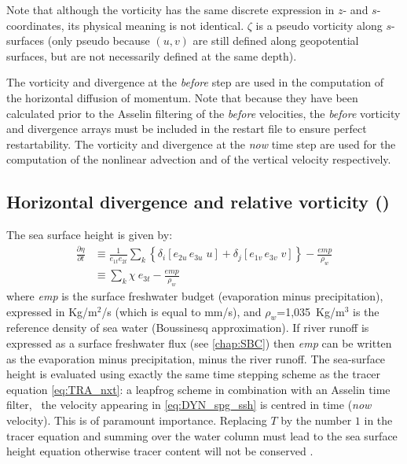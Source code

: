 \documentclass[../main/NEMO_manual]{subfiles}
\begin{document}
Note that although the vorticity has the same discrete expression in $z$- and $s$-coordinates,
its physical meaning is not identical.
$\zeta$ is a pseudo vorticity along $s$-surfaces
(only pseudo because $(u,v)$ are still defined along geopotential surfaces,
but are not necessarily defined at the same depth).

The vorticity and divergence at the \textit{before} step are used in the computation of
the horizontal diffusion of momentum.
Note that because they have been calculated prior to the Asselin filtering of the \textit{before} velocities,
the \textit{before} vorticity and divergence arrays must be included in the restart file to
ensure perfect restartability.
The vorticity and divergence at the \textit{now} time step are used for the computation of
the nonlinear advection and of the vertical velocity respectively.

\subsection[Horizontal divergence and relative vorticity (\textit{sshwzv.F90})]{Horizontal divergence and relative vorticity (\protect{})}
\label{subsec:DYN_sshwzv}

The sea surface height is given by:
\begin{equation}
  \label{eq:DYN_spg_ssh}
  \begin{aligned}
    \frac{\partial \eta }{\partial t}
    &\equiv    \frac{1}{e_{1t} e_{2t} }\sum\limits_k { \left\{  \delta_i \left[ {e_{2u}\,e_{3u}\;u} \right]
        +\delta_j \left[ {e_{1v}\,e_{3v}\;v} \right]  \right\} }
    -    \frac{\textit{emp}}{\rho_w }   \\
    &\equiv    \sum\limits_k {\chi \ e_{3t}}  -  \frac{\textit{emp}}{\rho_w }
  \end{aligned}
\end{equation}
where \textit{emp} is the surface freshwater budget (evaporation minus precipitation),
expressed in Kg/m$^2$/s (which is equal to mm/s),
and $\rho_w$=1,035~Kg/m$^3$ is the reference density of sea water (Boussinesq approximation).
If river runoff is expressed as a surface freshwater flux (see \autoref{chap:SBC}) then
\textit{emp} can be written as the evaporation minus precipitation, minus the river runoff.
The sea-surface height is evaluated using exactly the same time stepping scheme as
the tracer equation \autoref{eq:TRA_nxt}:
a leapfrog scheme in combination with an Asselin time filter,
\ie\ the velocity appearing in \autoref{eq:DYN_spg_ssh} is centred in time (\textit{now} velocity).
This is of paramount importance.
Replacing $T$ by the number $1$ in the tracer equation and summing over the water column must lead to
the sea surface height equation otherwise tracer content will not be conserved
\citep{griffies.pacanowski.ea_MWR01, leclair.madec_OM09}.
\end{document}
